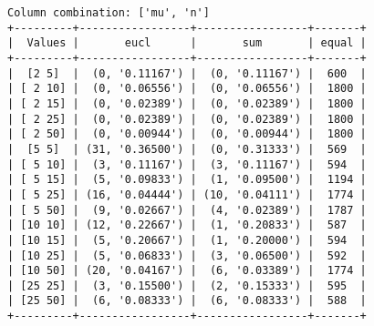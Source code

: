 \documentclass{article}
\begin{document}
\begin{verbatim}
Column combination: ['mu', 'n']
+---------+-----------------+-----------------+-------+
|  Values |       eucl      |       sum       | equal |
+---------+-----------------+-----------------+-------+
|  [2 5]  |  (0, '0.11167') |  (0, '0.11167') |  600  |
| [ 2 10] |  (0, '0.06556') |  (0, '0.06556') |  1800 |
| [ 2 15] |  (0, '0.02389') |  (0, '0.02389') |  1800 |
| [ 2 25] |  (0, '0.02389') |  (0, '0.02389') |  1800 |
| [ 2 50] |  (0, '0.00944') |  (0, '0.00944') |  1800 |
|  [5 5]  | (31, '0.36500') |  (0, '0.31333') |  569  |
| [ 5 10] |  (3, '0.11167') |  (3, '0.11167') |  594  |
| [ 5 15] |  (5, '0.09833') |  (1, '0.09500') |  1194 |
| [ 5 25] | (16, '0.04444') | (10, '0.04111') |  1774 |
| [ 5 50] |  (9, '0.02667') |  (4, '0.02389') |  1787 |
| [10 10] | (12, '0.22667') |  (1, '0.20833') |  587  |
| [10 15] |  (5, '0.20667') |  (1, '0.20000') |  594  |
| [10 25] |  (5, '0.06833') |  (3, '0.06500') |  592  |
| [10 50] | (20, '0.04167') |  (6, '0.03389') |  1774 |
| [25 25] |  (3, '0.15500') |  (2, '0.15333') |  595  |
| [25 50] |  (6, '0.08333') |  (6, '0.08333') |  588  |
+---------+-----------------+-----------------+-------+
\end{verbatim}
\end{document}

